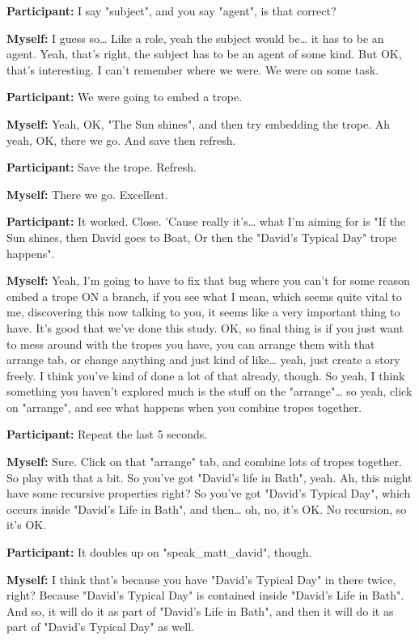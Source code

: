 \documentclass[11pt]{report}
\newcommand{\llabel}[1]{\hypertarget{llineno:#1}{\linelabel{#1}}}
\begin{document}
\begin{linenumbers}
\textbf{Participant:} I say "subject", and you say "agent", is that correct?

\textbf{Myself:} I guess so\ldots{} Like a role, yeah the subject would be\ldots{} it has to be an agent. Yeah, that's right, the subject has to be an agent of some kind. But OK, that's interesting. I can't remember where we were. We were on some task.

\textbf{Participant:} We were going to embed a trope.

\textbf{Myself:} Yeah, OK, "The Sun shines", and then try embedding the trope. Ah yeah, OK, there we go. And save then refresh.

\textbf{Participant:} Save the trope. Refresh.

\textbf{Myself:} There we go. Excellent.

\textbf{Participant:} It worked. Close. 'Cause really it's\ldots{} what I'm aiming for is "If the Sun shines, then David goes to Boat, Or then the "David's Typical Day" trope happens".

\textbf{Myself:} Yeah, I'm going to have to fix that bug where you can't for
some reason embed a trope ON a branch, if you see what I mean, which seems quite
vital to me, discovering this now talking to you, it seems like a very important
thing to have. It's good that we've done this study. OK, so final thing is if
you just want to mess around with the tropes you have, you can arrange them with
that arrange tab, or change anything and just kind of like\ldots{} yeah, just
create a story freely. I think you've kind of done a lot of that already,
though. So yeah, I think something you haven't explored much is the stuff on the
"arrange"\ldots{} so yeah, click on "arrange", and see what happens when you
combine tropes together.\llabel{lne:bug3b}

\textbf{Participant:} Repeat the last 5 seconds.

\textbf{Myself:} Sure. Click on that "arrange" tab, and combine lots of tropes together. So play with that a bit. So you've got "David's life in Bath", yeah. Ah, this might have some recursive properties right? So you've got "David's Typical Day", which occurs inside "David's Life in Bath", and then\ldots{} oh, no, it's OK. No recursion, so it's OK.

\textbf{Participant:} It doubles up on "speak_matt_david", though.

\textbf{Myself:} I think that's because you have "David's Typical Day" in there twice, right? Because "David's Typical Day" is contained inside "David's Life in Bath". And so, it will do it as part of "David's Life in Bath", and then it will do it as part of "David's Typical Day" as well.


\end{linenumbers}
\end{document}
